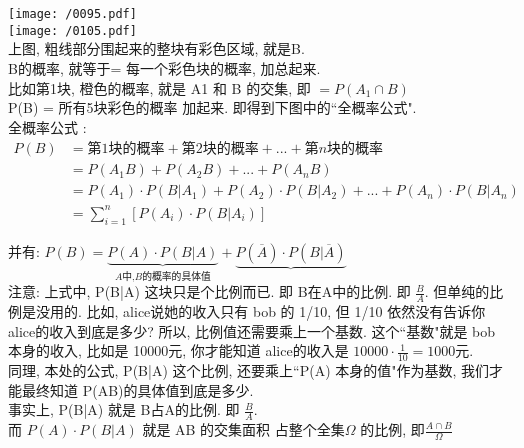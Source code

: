 \documentclass[UTF8]{ctexart}
\begin{document}
	\texttt{[image: /0095.pdf]} \\
	
	\texttt{[image: /0105.pdf]} \\
	
	上图, 粗线部分围起来的整块有彩色区域, 就是B.  \\
	B的概率, 就等于= 每一个彩色块的概率, 加总起来. \\
	
	比如第1块, 橙色的概率, 就是 A1 和 B 的交集, 即 $ = P(A_1 \cap B)$ \\
	P(B) = 所有5块彩色的概率 加起来. 即得到下图中的``全概率公式". \\
	
	全概率公式 : 
	\begin{align*}  %
	P\left( B \right) &=\text{第1块的概率}+\text{第2块的概率}+...+\text{第}n\text{块的概率}\\
&=P\left( A_1B \right) +P\left( A_2B \right) +...+P\left( A_nB \right)\\
&=P\left( A_1 \right) \cdot P\left( B|A_1 \right) +P\left( A_2 \right) \cdot P\left( B|A_2 \right) +...+P\left( A_n \right) \cdot P\left( B|A_n \right)\\
&=\sum_{i=1}^n{\left[ P\left( A_i \right) \cdot P\left( B|A_i \right) \right]} 
	\end{align*}
	
	并有: $
	P\left( B \right) =\underset{A\text{中,}B\text{的概率的具体值}}{\underbrace{P\left( A \right) \cdot P\left( B|A \right) }}+\underset{}{\underbrace{P\left( \overline{A} \right) \cdot P\left( B|\overline{A} \right) }}
	$ \\
	
	注意: 上式中,  P(B|A) 这块只是个比例而已. 即 B在A中的比例. 即 $\frac{B} {A}$. 但单纯的比例是没用的. 比如, alice说她的收入只有 bob 的 1/10, 但 1/10 依然没有告诉你 alice的收入到底是多少? 所以, 比例值还需要乘上一个基数. 这个``基数"就是 bob 本身的收入, 比如是 10000元, 你才能知道 alice的收入是 $10000 \cdot \frac{1} {10} = 1000$元. \\
	
	同理, 本处的公式, P(B|A) 这个比例, 还要乘上``P(A) 本身的值"作为基数, 我们才能最终知道 P(AB)的具体值到底是多少. \\
	事实上, P(B|A) 就是 B占A的比例. 即 $\frac{B} {A}$. \\
	而 $P(A) \cdot  P(B|A)$ 就是 AB 的交集面积 占整个全集$\varOmega $ 的比例, 即$	\frac{A\cap B}{\varOmega}	$ \\
	
\end{document}
